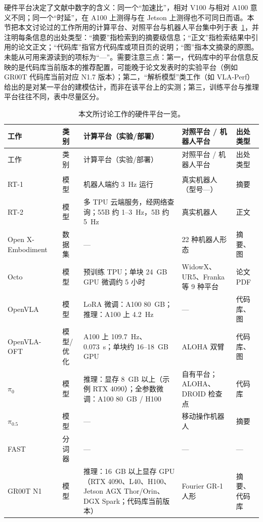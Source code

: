 \documentclass[a4paper,10.5pt]{ctexart}
\newcommand{\pizero}{$\pi_0$}
\newcommand{\pihalf}{$\pi_{0.5}$}
\begin{document}
硬件平台决定了文献中数字的含义：同一个“加速比”，相对 V100 与相对 A100 意义不同；同一个“时延”，在 A100 上测得与在 Jetson 上测得也不可同日而语。本节把本文讨论过的工作所用的计算平台、对照平台与机器人平台集中列于表~\ref{tab:platforms}，并注明每条信息的出处类型：“摘要”指检索到的摘要级信息；“正文”指检索结果中引用的论文正文；“代码库”指官方代码库或项目页的说明；“图”指本文摘录的原图。未能从可用来源读到的项标为“—”。需要注意三点：第一，代码库中的平台信息反映的是代码库当前版本的推荐配置，可能晚于论文发表时的实验平台（例如 GR00T 代码库当前对应 N1.7 版本）；第二，“解析模型”类工作（如 VLA-Perf）给出的是对某一平台的建模估计，而非在该平台上的实测；第三，训练平台与推理平台往往不同，表中尽量区分。

\begin{small}
\begin{longtable}{p{2.2cm} p{1.5cm} p{4.6cm} p{3.6cm} p{1.9cm}}
\caption{本文所讨论工作的硬件平台一览。}\label{tab:platforms}\\
\toprule
工作 & 类别 & 计算平台（实验/部署） & 对照平台 / 机器人平台 & 出处类型 \\
\midrule
\endfirsthead
\toprule
工作 & 类别 & 计算平台（实验/部署） & 对照平台 / 机器人平台 & 出处类型 \\
\midrule
\endhead
\bottomrule
\endfoot
\multicolumn{5}{l}{\textit{VLA 模型与数据集}} \\
RT-1~\cite{rt1} & 模型 & 机器人端约 3~Hz 运行 & 真实机器人（型号—） & 摘要 \\
RT-2~\cite{rt2} & 模型 & 多 TPU 云端服务，经网络查询；55B 约 1--3~Hz，5B 约 5~Hz & 真实机器人 & 正文 \\
Open X-Embodiment~\cite{oxe} & 数据集 & — & 22 种机器人形态 & 摘要、图 \\
Octo~\cite{octo} & 模型 & 预训练 TPU；单块 24~GB GPU 微调约 5 小时 & WidowX、UR5、Franka 等 9 种平台 & 论文 PDF \\
OpenVLA~\cite{openvla} & 模型 & LoRA 微调：A100 80~GB；推理：A100 上 4.2~Hz & — & 代码库、图 \\
OpenVLA-OFT~\cite{openvlaoft} & 模型/优化 & A100 上 109.7~Hz、0.073~s；单块约 16--18~GB GPU & ALOHA 双臂 & 代码库、图 \\
\pizero~\cite{pi0} & 模型 & 推理：显存 8~GB 以上（示例 RTX 4090）；全参数微调：A100 80~GB / H100 & 自有平台；ALOHA、DROID 检查点 & 代码库 \\
\pihalf~\cite{pi05} & 模型 & — & 移动操作机器人 & 摘要 \\
FAST~\cite{fast} & 分词器 & — & — & — \\
GR00T N1~\cite{gr00t} & 模型 & 推理：16~GB 以上显存 GPU（RTX 4090、L40、H100、Jetson AGX Thor/Orin、DGX Spark；代码库当前版本） & Fourier GR-1 人形 & 摘要、代码库 \\

\end{longtable}
\end{small}
\end{document}
